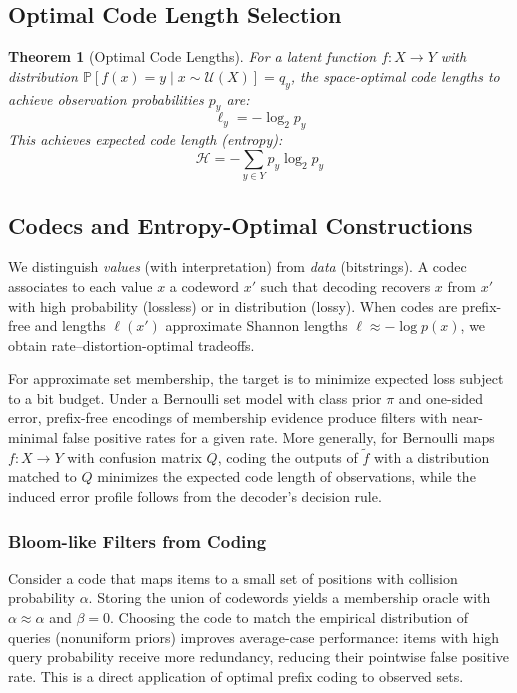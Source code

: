 \documentclass[11pt,final,hidelinks]{article}
\newtheorem{theorem}{Theorem}[section]
\newcommand{\ProbCond}[2]{\mathbb{P}\left[#1 \mid #2\right]}
\newcommand{\fprate}{\alpha}
\newcommand{\fnrate}{\beta}
\begin{document}
\subsection{Optimal Code Length Selection}

\begin{theorem}[Optimal Code Lengths]
For a latent function $f: X \to Y$ with distribution $\ProbCond{f(x) = y}{x \sim \mathcal{U}(X)} = q_y$, the space-optimal code lengths to achieve observation probabilities $p_y$ are:
\begin{equation}
\ell_y = -\log_2 p_y
\end{equation}
This achieves expected code length (entropy):
\begin{equation}
\mathcal{H} = -\sum_{y \in Y} p_y \log_2 p_y
\end{equation}
\end{theorem}

\subsection{Codecs and Entropy-Optimal Constructions}

We distinguish \emph{values} (with interpretation) from \emph{data} (bitstrings). A codec associates to each value $x$ a codeword $x'$ such that decoding recovers $x$ from $x'$ with high probability (lossless) or in distribution (lossy). When codes are prefix-free and lengths $\ell(x')$ approximate Shannon lengths $\ell\approx -\log p(x)$, we obtain rate–distortion-optimal tradeoffs.

For approximate set membership, the target is to minimize expected loss subject to a bit budget. Under a Bernoulli set model with class prior $\pi$ and one-sided error, prefix-free encodings of membership evidence produce filters with near-minimal false positive rates for a given rate. More generally, for Bernoulli maps $f:X\to Y$ with confusion matrix $Q$, coding the outputs of $\tilde{f}$ with a distribution matched to $Q$ minimizes the expected code length of observations, while the induced error profile follows from the decoder's decision rule.

\subsubsection{Bloom-like Filters from Coding}
Consider a code that maps items to a small set of positions with collision probability $\alpha$. Storing the union of codewords yields a membership oracle with $\fprate\approx\alpha$ and $\fnrate=0$. Choosing the code to match the empirical distribution of queries (nonuniform priors) improves average-case performance: items with high query probability receive more redundancy, reducing their pointwise false positive rate. This is a direct application of optimal prefix coding to observed sets.
\end{document}
